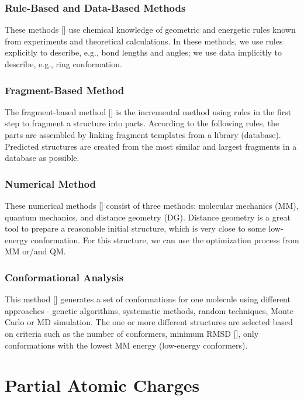 \subsection{Rule-Based and Data-Based Methods}

These methods [] use chemical knowledge of geometric and energetic rules known
from experiments and theoretical calculations. In these methods, we use rules
explicitly to describe, e.g., bond lengths and angles; we use data implicitly
to describe, e.g., ring conformation.

\subsection{Fragment-Based Method}

The fragment-based method [] is the incremental method using rules in the first
step to fragment a structure into parts. According to the following rules,
the parts are assembled by linking fragment templates from a library
(database). Predicted structures are created from the most similar and largest
fragments in a database as possible.

\subsection{Numerical Method}

These numerical methods [] consist of three methods: molecular mechanics
(MM), quantum mechanics, and distance geometry (DG). Distance geometry is
a great tool to prepare a reasonable initial structure, which is very close
to some low-energy conformation. For this structure, we can use
the optimization process from MM or/and QM.

\subsection{Conformational Analysis}

This method [] generates a set of conformations for one molecule using
different approaches - genetic algorithms, systematic methods, random
techniques, Monte Carlo or MD simulation. The one or more different structures
are selected based on criteria such as the number of conformers, minimum
RMSD [], only conformations with the lowest MM energy (low-energy conformers).

\chapter{Partial Atomic Charges}

